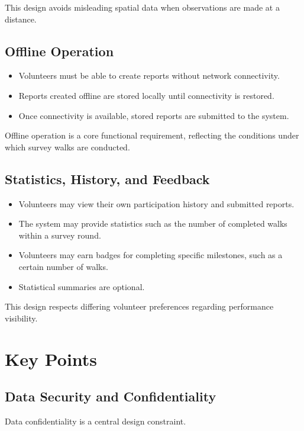 \documentclass[11pt]{article}
\begin{document}
This design avoids misleading spatial data when observations are made at a distance.

\subsection{Offline Operation}

\begin{itemize}
    \item Volunteers must be able to create reports without network connectivity.
    \item Reports created offline are stored locally until connectivity is restored.
    \item Once connectivity is available, stored reports are submitted to the system.
\end{itemize}

Offline operation is a core functional requirement, reflecting the conditions under which survey walks are conducted.

\subsection{Statistics, History, and Feedback}

\begin{itemize}
    \item Volunteers may view their own participation history and submitted reports.
    \item The system may provide statistics such as the number of completed walks within a survey round.
    \item Volunteers may earn badges for completing specific milestones, such as a certain number of walks.
    \item Statistical summaries are optional.
\end{itemize}

This design respects differing volunteer preferences regarding performance visibility.

\section{Key Points}

\subsection{Data Security and Confidentiality}

Data confidentiality is a central design constraint.
\end{document}
